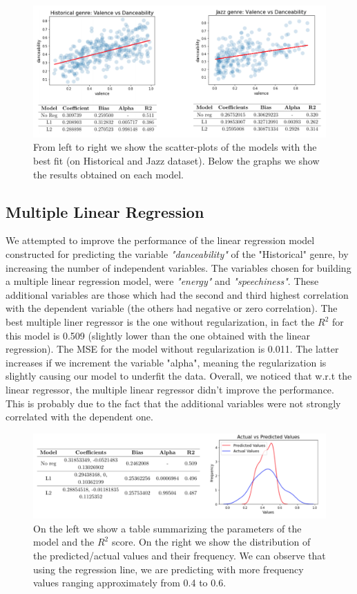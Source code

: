 \begin{figure}[!htb]
  \centering
  \includegraphics[width=1\linewidth]{images/lr-functions-tables.png}
  \caption{From left to right we show the scatter-plots of the models with the best fit (on Historical and Jazz dataset). Below the graphs we show the results obtained on each model.}
\end{figure}


\subsection{Multiple Linear Regression}
We attempted to improve the performance of the linear regression model constructed for predicting the variable \textit{"danceability"} of the "Historical" genre, by increasing the number of independent variables.
The variables chosen for building a multiple linear regression model, were \textit{"energy"} and \textit{"speechiness"}. These additional variables are those which had the second and third highest correlation with the dependent variable (the others had negative or zero correlation). 
The best multiple liner regressor is the one without regularization, in fact the $R^2$ for this model is 0.509 (slightly lower than the one obtained with the linear regression). The MSE for the model without regularization is 0.011. The latter increases if we increment the variable "alpha", meaning the regularization is slightly causing our model to underfit the data. Overall, we noticed that w.r.t the linear regressor, the multiple linear regressor didn't improve the performance. This is probably due to the fact that the additional variables were not strongly correlated with the dependent one.

\begin{figure}[!htb]
  \centering
  \includegraphics[width=1\linewidth]{images/mlr-act-pred-tab-hist.png}
  \caption{On the left we show a table summarizing the parameters of the model and the $R^2$ score. On the right we show the distribution of the predicted/actual values and their frequency. We can observe that using the regression line, we are predicting with more frequency values ranging approximately from 0.4 to 0.6.  
  }
\end{figure}

